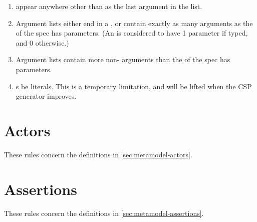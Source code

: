 \begin{enumerate}
\item
	\mrestargument{} \rfcmustnot{} appear anywhere other than as the last
	argument in the list.
\item
	Argument lists \rfcmust{} either end in a \mrestargument, or
	contain exactly as many arguments as the \mmessagetopic{} of the spec
	has parameters.  (An \meventtopic{} is considered to have 1 parameter
	if typed, and 0 otherwise.)
\item
	Argument lists \rfcmustnot{} contain more non-\mrestargument{}
	arguments than the \mmessagetopic{} of the spec has parameters.
\item
	\mexpressionargument s \rfcshould{} be literals.  This is a temporary
	limitation, and will be lifted when the CSP generator improves.
\end{enumerate}

\section{Actors}\label{sec:wf-actors}

These rules concern the definitions in \cref{sec:metamodel-actors}.

\section{Assertions}\label{sec:wf-assertions}

These rules concern the definitions in \cref{sec:metamodel-assertions}.
